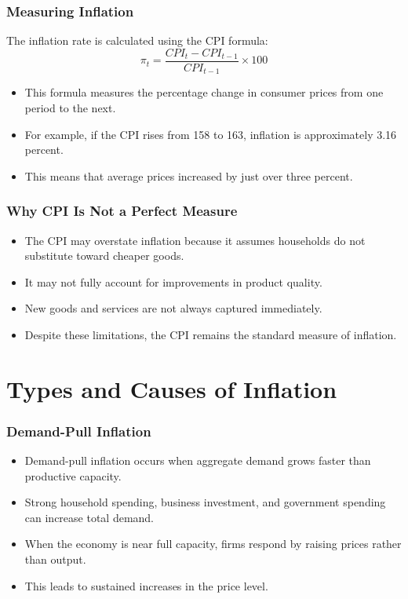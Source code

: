 \documentclass[aspectratio=169]{beamer}
\begin{document}
\begin{frame}
\transfade
\frametitle{Measuring Inflation}
The inflation rate is calculated using the CPI formula:
\[
\pi_t = \frac{CPI_t - CPI_{t-1}}{CPI_{t-1}} \times 100
\]
\begin{itemize}
\item This formula measures the percentage change in consumer prices from one period to the next.
\item For example, if the CPI rises from 158 to 163, inflation is approximately 3.16 percent.
\item This means that average prices increased by just over three percent.
\end{itemize}
\end{frame}

\begin{frame}
\transfade
\frametitle{Why CPI Is Not a Perfect Measure}
\begin{itemize}
\item The CPI may overstate inflation because it assumes households do not substitute toward cheaper goods.
\item It may not fully account for improvements in product quality.
\item New goods and services are not always captured immediately.
\item Despite these limitations, the CPI remains the standard measure of inflation.
\end{itemize}
\end{frame}



\section{Types and Causes of Inflation}

\begin{frame}
\transfade
\frametitle{Demand-Pull Inflation}
\begin{itemize}
\item Demand-pull inflation occurs when aggregate demand grows faster than productive capacity.
\item Strong household spending, business investment, and government spending can increase total demand.
\item When the economy is near full capacity, firms respond by raising prices rather than output.
\item This leads to sustained increases in the price level.
\end{itemize}
\end{frame}
\end{document}

